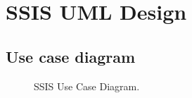 \chapter{SSIS UML Design}
\section{Use case diagram}
\begin{figure}[ht!]
\centering
{}
\caption{SSIS Use Case Diagram.}
\end{figure}
